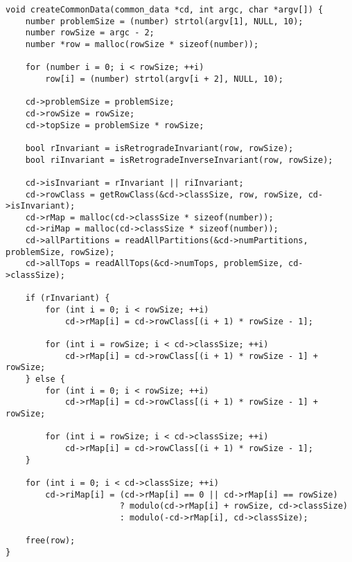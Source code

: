 \begin{lstlisting}[caption={Allocating thread-common data.},label={createCommonData}]
void createCommonData(common_data *cd, int argc, char *argv[]) {
    number problemSize = (number) strtol(argv[1], NULL, 10);
    number rowSize = argc - 2;
    number *row = malloc(rowSize * sizeof(number));

    for (number i = 0; i < rowSize; ++i)
        row[i] = (number) strtol(argv[i + 2], NULL, 10);

    cd->problemSize = problemSize;
    cd->rowSize = rowSize;
    cd->topSize = problemSize * rowSize;

    bool rInvariant = isRetrogradeInvariant(row, rowSize);
    bool riInvariant = isRetrogradeInverseInvariant(row, rowSize);

    cd->isInvariant = rInvariant || riInvariant;
    cd->rowClass = getRowClass(&cd->classSize, row, rowSize, cd->isInvariant);
    cd->rMap = malloc(cd->classSize * sizeof(number));
    cd->riMap = malloc(cd->classSize * sizeof(number));
    cd->allPartitions = readAllPartitions(&cd->numPartitions, problemSize, rowSize);
    cd->allTops = readAllTops(&cd->numTops, problemSize, cd->classSize);

    if (rInvariant) {
        for (int i = 0; i < rowSize; ++i)
            cd->rMap[i] = cd->rowClass[(i + 1) * rowSize - 1];

        for (int i = rowSize; i < cd->classSize; ++i)
            cd->rMap[i] = cd->rowClass[(i + 1) * rowSize - 1] + rowSize;
    } else {
        for (int i = 0; i < rowSize; ++i)
            cd->rMap[i] = cd->rowClass[(i + 1) * rowSize - 1] + rowSize;

        for (int i = rowSize; i < cd->classSize; ++i)
            cd->rMap[i] = cd->rowClass[(i + 1) * rowSize - 1];
    }

    for (int i = 0; i < cd->classSize; ++i)
        cd->riMap[i] = (cd->rMap[i] == 0 || cd->rMap[i] == rowSize)
                       ? modulo(cd->rMap[i] + rowSize, cd->classSize)
                       : modulo(-cd->rMap[i], cd->classSize);

    free(row);
}
\end{lstlisting}

